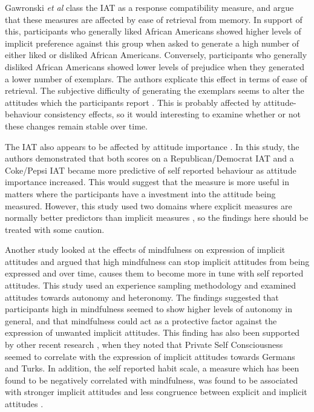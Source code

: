 Gawronski \textit{et al} class the IAT as a response compatibility measure, and argue that these measures are affected by ease of retrieval from memory. In support of this, participants who generally liked African Americans showed higher levels of implicit preference against this group when asked to generate a high number of either liked or disliked African Americans. Conversely, participants who generally disliked African Americans showed lower levels of prejudice when they generated a lower number of exemplars. The authors explicate this effect in terms of ease of retrieval. The subjective difficulty of generating the exemplars seems to alter the attitudes which the participants report \cite{Kahneman2002}.  %
This is probably affected by attitude-behaviour consistency effects, so it would interesting to examine whether or not these changes remain stable over time.  

The IAT also appears to be affected by attitude importance \cite{Karpinski2005}. In this study, the authors demonstrated that both scores on a Republican/Democrat IAT and a Coke/Pepsi IAT became more predictive of self reported behaviour as attitude importance increased. This would suggest that the measure is more useful in matters where the participants have a investment into the attitude being measured. However, this study used two domains where explicit measures are normally better predictors than implicit measures \cite{Nosek2007d}, so the findings here should be treated with some caution. 

Another study \cite{Levesque2007} looked at the effects of mindfulness on expression of implicit attitudes and argued that high mindfulness can stop implicit attitudes from being expressed and over time, causes them to become more in tune with self reported attitudes. This study used an experience sampling methodology and examined attitudes towards autonomy and heteronomy. The findings suggested that participants high in mindfulness seemed to show higher levels of autonomy in general, and that mindfulness could act as a protective factor against the expression of unwanted implicit attitudes.  This finding has also been supported by other recent research \cite{Gschwendner2006}, when they noted that Private Self Consciousness seemed to correlate with the expression of implicit attitudes towards Germans and Turks. In addition, the self reported habit scale, a measure which has been found to be negatively correlated with mindfulness, was found to be associated with stronger implicit attitudes and less congruence between explicit and implicit attitudes \cite{Conner2007}. 

